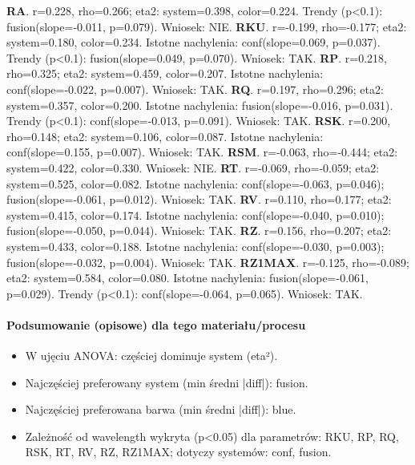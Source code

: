 \documentclass[
  10pt,
]{article}
\begin{document}
\textbf{RA}. r=0.228, rho=0.266; eta2: system=0.398, color=0.224. Trendy
(p\textless0.1): fusion(slope=-0.011, p=0.079). Wniosek: NIE.
\textbf{RKU}. r=-0.199, rho=-0.177; eta2: system=0.180, color=0.234.
Istotne nachylenia: conf(slope=0.069, p=0.037). Trendy (p\textless0.1):
fusion(slope=0.049, p=0.070). Wniosek: TAK. \textbf{RP}. r=0.218,
rho=0.325; eta2: system=0.459, color=0.207. Istotne nachylenia:
conf(slope=-0.022, p=0.007). Wniosek: TAK. \textbf{RQ}. r=0.197,
rho=0.296; eta2: system=0.357, color=0.200. Istotne nachylenia:
fusion(slope=-0.016, p=0.031). Trendy (p\textless0.1):
conf(slope=-0.013, p=0.091). Wniosek: TAK. \textbf{RSK}. r=0.200,
rho=0.148; eta2: system=0.106, color=0.087. Istotne nachylenia:
conf(slope=0.155, p=0.007). Wniosek: TAK. \textbf{RSM}. r=-0.063,
rho=-0.444; eta2: system=0.422, color=0.330. Wniosek: NIE. \textbf{RT}.
r=-0.069, rho=-0.059; eta2: system=0.525, color=0.082. Istotne
nachylenia: conf(slope=-0.063, p=0.046); fusion(slope=-0.061, p=0.012).
Wniosek: TAK. \textbf{RV}. r=0.110, rho=0.177; eta2: system=0.415,
color=0.174. Istotne nachylenia: conf(slope=-0.040, p=0.010);
fusion(slope=-0.050, p=0.044). Wniosek: TAK. \textbf{RZ}. r=0.156,
rho=0.207; eta2: system=0.433, color=0.188. Istotne nachylenia:
conf(slope=-0.030, p=0.003); fusion(slope=-0.032, p=0.004). Wniosek:
TAK. \textbf{RZ1MAX}. r=-0.125, rho=-0.089; eta2: system=0.584,
color=0.080. Istotne nachylenia: fusion(slope=-0.061, p=0.029). Trendy
(p\textless0.1): conf(slope=-0.064, p=0.065). Wniosek: TAK.

\paragraph{Podsumowanie (opisowe) dla tego materiału/procesu}
\begin{itemize}
\item W ujęciu ANOVA: częściej dominuje system (eta²).
\item Najczęściej preferowany system (min średni |diff|): fusion.
\item Najczęściej preferowana barwa (min średni |diff|): blue.
\item Zależność od wavelength wykryta (p<0.05) dla parametrów: RKU, RP, RQ, RSK, RT, RV, RZ, RZ1MAX; dotyczy systemów: conf, fusion.
\end{itemize}
\end{document}
